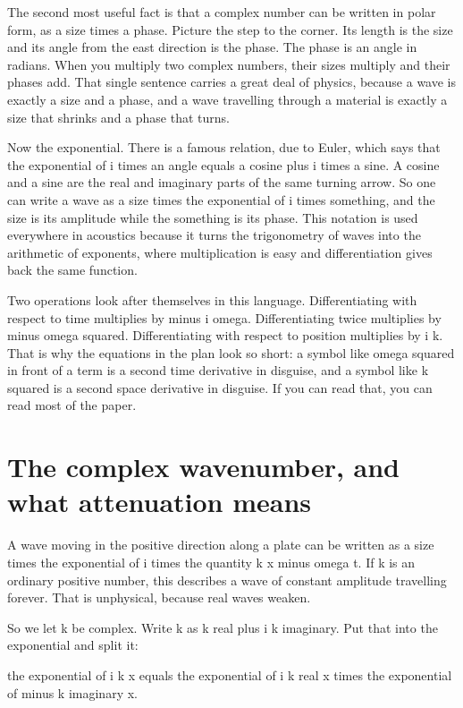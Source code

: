 \documentclass[11pt]{article}
\begin{document}
The second most useful fact is that a complex number can be written in polar form, as a size times a phase.
Picture the step to the corner. Its length is the size and its angle from the east direction is the phase.
The phase is an angle in radians. When you multiply two complex numbers, their sizes multiply and their
phases add. That single sentence carries a great deal of physics, because a wave is exactly a size and a
phase, and a wave travelling through a material is exactly a size that shrinks and a phase that turns.

Now the exponential. There is a famous relation, due to Euler, which says that the exponential of i times an
angle equals a cosine plus i times a sine. A cosine and a sine are the real and imaginary parts of the same
turning arrow. So one can write a wave as a size times the exponential of i times something, and the size is
its amplitude while the something is its phase. This notation is used everywhere in acoustics because it
turns the trigonometry of waves into the arithmetic of exponents, where multiplication is easy and
differentiation gives back the same function.

Two operations look after themselves in this language. Differentiating with respect to time multiplies by
minus i omega. Differentiating twice multiplies by minus omega squared. Differentiating with respect to
position multiplies by i k. That is why the equations in the plan look so short: a symbol like omega squared
in front of a term is a second time derivative in disguise, and a symbol like k squared is a second space
derivative in disguise. If you can read that, you can read most of the paper.

\section{The complex wavenumber, and what attenuation means}

A wave moving in the positive direction along a plate can be written as a size times the exponential of i
times the quantity k x minus omega t. If k is an ordinary positive number, this describes a wave of constant
amplitude travelling forever. That is unphysical, because real waves weaken.

So we let k be complex. Write k as k real plus i k imaginary. Put that into the exponential and split it:

the exponential of i k x equals the exponential of i k real x times the exponential of minus k imaginary x.
\end{document}
